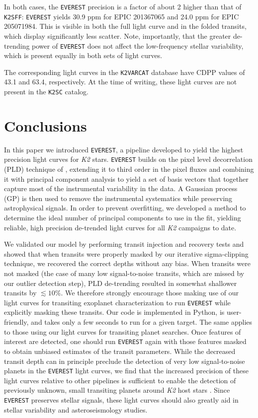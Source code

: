 \documentclass[]{emulateapj}
\begin{document}
In both cases, the \texttt{EVEREST} precision is a factor of about 2 higher than that of
\texttt{K2SFF}: \texttt{EVEREST} yields 30.9 ppm for EPIC 201367065 and 24.0 ppm for EPIC 205071984. 
This is visible 
in both the full light curve and in the folded transits,
which display significantly less scatter. Note, importantly, that the greater de-trending
power of \texttt{EVEREST} does not affect the low-frequency stellar variability, which is 
present equally in both sets of light curves.

The corresponding light curves in the \texttt{K2VARCAT} database have CDPP values of 43.1
and 63.4, respectively. At the time of writing, these light curves are not present in the
\texttt{K2SC} catalog.

\section{Conclusions}
\label{sec:conclusions}
In this paper we introduced \texttt{EVEREST}, a pipeline developed to yield the highest
precision light curves for \emph{K2} stars. \texttt{EVEREST} builds on the pixel level
decorrelation (PLD) technique of \cite{DEM15}, extending it to third order in the pixel
fluxes and combining it with principal component analysis to yield a set of basis
vectors that together capture most of the instrumental variability in the data. A Gaussian
process (GP) is then used to remove the instrumental
systematics while preserving astrophysical signals. In order to prevent overfitting, we
developed a method to determine the ideal number of principal components to use in the fit, yielding reliable,
high precision de-trended light curves for all \emph{K2} campaigns to date.

We validated our model by performing transit injection and recovery tests and showed that
when transits were properly masked by our iterative sigma-clipping technique, we recovered the correct depths
without any bias.
When transits were not masked (the case of many low signal-to-noise transits, which
are missed by our outlier detection step), PLD de-trending
resulted in somewhat shallower transits by $\lesssim 10\%$. 
We therefore strongly encourage those making use of our light curves for transiting exoplanet
characterization to run \texttt{EVEREST} while explicitly masking these transits. Our code
is implemented in Python, is user-friendly, and takes only a few seconds to run for a given
target. The same applies to those using our light
curves for transiting planet searches. Once features of interest are detected, one
should run \texttt{EVEREST} again with those features masked to obtain unbiased
estimates of the transit parameters.
While the decreased transit depth can in principle preclude the detection of very low signal-to-noise
planets in the \texttt{EVEREST} light curves, we find that the increased precision of these light curves
relative to other pipelines is sufficient to enable the 
detection of previously unknown, small transiting planets around \emph{K2} host stars \citep{KRU16}.
Since \texttt{EVEREST} preserves stellar signals,
these light curves should also greatly aid in stellar variability and asteroseismology studies.
\end{document}
